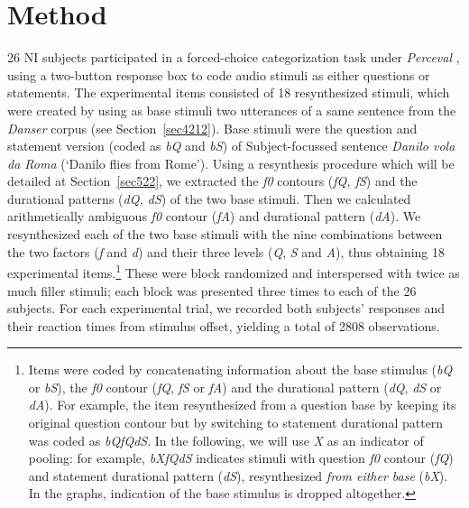 \section{Method}\label{sec52}
26 NI subjects participated in a forced-choice categorization task under \textit{Perceval} \citep{andre2003perceval}, using a two-button response box to code audio stimuli as either questions or statements. The experimental items consisted of 18 resynthesized stimuli, which were created by using as base stimuli two utterances of a same sentence from the \textit{Danser} corpus (see Section~\ref{sec4212}). Base stimuli were the question and statement version (coded as \textit{bQ} and \textit{bS}) of Subject-focussed sentence \textit{Danilo vola da Roma} (`Danilo flies from Rome'). Using a resynthesis procedure which will be detailed at Section~\ref{sec522}, we extracted the \textit{f0} contours (\textit{fQ, fS}) and the durational patterns (\textit{dQ, dS}) of the two base stimuli. Then we calculated arithmetically ambiguous \textit{f0} contour (\textit{fA}) and durational pattern (\textit{dA}). We resynthesized each of the two base stimuli with the nine combinations between the two factors (\textit{f} and \textit{d}) and their three levels (\textit{Q}, \textit{S} and \textit{A}), thus obtaining 18 experimental items.\footnote{Items were coded by concatenating information about the base stimulus (\textit{bQ} or \textit{bS}), the \textit{f0} contour (\textit{fQ}, \textit{fS} or \textit{fA}) and the durational pattern (\textit{dQ}, \textit{dS} or \textit{dA}). For example, the item resynthesized from a question base by keeping its original question contour but by switching to statement durational pattern was coded as \textit{bQfQdS}. In the following, we will use \textit{X} as an indicator of pooling: for example, \textit{bXfQdS} indicates stimuli with question \textit{f0} contour (\textit{fQ}) and statement durational pattern (\textit{dS}), resynthesized \textit{from either base} (\textit{bX}). In the graphs, indication of the base stimulus is dropped altogether.} These were block randomized and interspersed with twice as much filler stimuli; each block was presented three times to each of the 26 subjects. For each experimental trial, we recorded both subjects' responses and their reaction times from stimulus offset, yielding a total of 2808 observations. 

